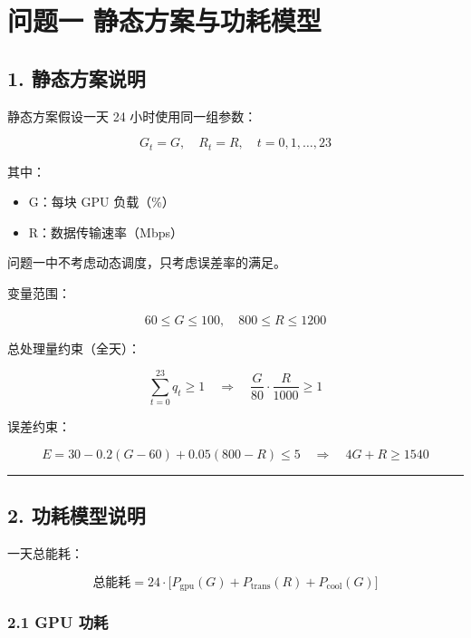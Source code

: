 \documentclass[
]{article}
\author{}
\date{}
\begin{document}
\section{问题一
静态方案与功耗模型}\label{ux95eeux9898ux4e00-ux9759ux6001ux65b9ux6848ux4e0eux529fux8017ux6a21ux578b}

\subsection{1.
静态方案说明}\label{1-ux9759ux6001ux65b9ux6848ux8bf4ux660e}

静态方案假设一天 24 小时使用同一组参数：

\[G_t = G, \quad R_t = R, \quad t = 0,1,\dots,23\]

其中：

\begin{itemize}
\item
  G：每块 GPU 负载（\%）
\item
  R：数据传输速率（Mbps）
\end{itemize}

问题一中不考虑动态调度，只考虑误差率的满足。

变量范围：

\[60 \le G \le 100, \quad 800 \le R \le 1200\]

总处理量约束（全天）：

\[\sum_{t=0}^{23} q_t \ge 1 \quad \Rightarrow \quad \frac{G}{80} \cdot \frac{R}{1000} \ge 1\]

误差约束：

\[E = 30 - 0.2 (G - 60) + 0.05 (800 - R) \le 5 \quad \Rightarrow \quad 4G + R \ge 1540\]

\begin{center}\rule{0.5\linewidth}{0.5pt}\end{center}

\subsection{2.
功耗模型说明}\label{2-ux529fux8017ux6a21ux578bux8bf4ux660e}

一天总能耗：

\[\text{总能耗} = 24 \cdot \Big[ P_\text{gpu}(G) + P_\text{trans}(R) + P_\text{cool}(G) \Big]\]

\subsubsection{2.1 GPU 功耗}\label{21-gpu-ux529fux8017}
\end{document}
